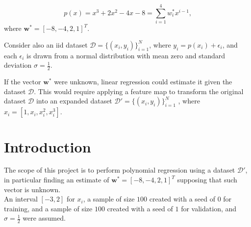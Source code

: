 \documentclass[a4paper,12pt]{article} %
\begin{document}
	

	\thispagestyle{empty}  
	\vspace{0.4cm}

	
	\begin{equation*}
	p(x)=x^3+2x^2-4x-8=\sum_{i=1}^4 w_i^*x^{i-1} \mbox{,}
	\end{equation*} 
	where $\textbf{w}^*=[-8,-4,2,1]^T$.
	
	Consider also an iid dataset $\mathcal{D} = \{(x_i, y_i)\}^N_{i=1}$, where 
	$y_i = p(x_i)+\epsilon_i$, and each $\epsilon_i$ is drawn from a normal 
	distribution with mean zero and standard deviation $\sigma = \frac{1}{2}$.
	
	If the vector $\textbf{w}^*$ were unknown, linear regression could estimate it given the dataset $\mathcal{D}$. This would require applying a feature map to transform the
	original dataset $\mathcal{D}$ into an expanded dataset $\mathcal{D}'= \{(x_i, y_i)\}^N_{i=1}$ , where $x_i = [1,x_i,x_i^2,x_i^3]$.
	
	
	\section{Introduction}
	The scope of this {project} is to perform polynomial regression using a dataset $\mathcal{D}'$, in particular finding an estimate of $\textbf{w}^*=[-8,-4,2,1]^T$ supposing that such vector is unknown.\\
	An interval $[-3, 2]$ for $x_i$, a sample of size $100$ created with a seed of $0$ for training, and a sample of size $100$ created with a seed of $1$ for validation, and $\sigma = \frac{1}{2}$ were assumed.
	
\end{document}
